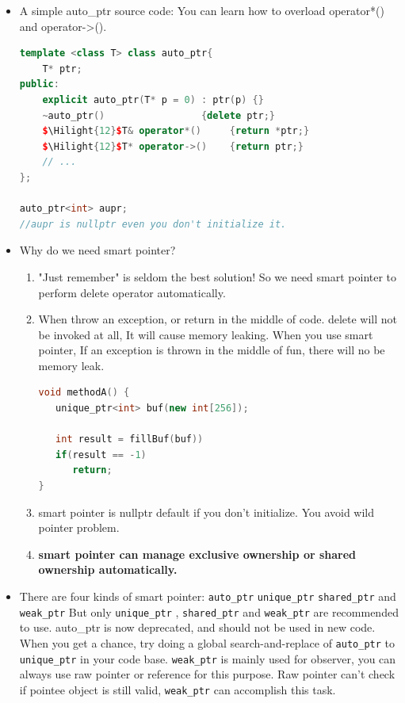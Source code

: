 \documentclass[a4paper,11pt,twoside]{book}
\newcommand{\Hilight}[1]{\makebox[0pt][l]{\color{yellow}\rule[-3pt]{#1em}{11pt}}}
\newcommand{\Hilight}[1]{}
\begin{document}
\begin{itemize}
\item A simple auto\_ptr source code: You can learn how to overload operator*() and operator->().
\begin{lstlisting}[frame=single, language=c++, mathescape=true]
template <class T> class auto_ptr{
    T* ptr;
public:
    explicit auto_ptr(T* p = 0) : ptr(p) {}
    ~auto_ptr()                 {delete ptr;}
    $\Hilight{12}$T& operator*()     {return *ptr;}
    $\Hilight{12}$T* operator->()    {return ptr;}
    // ...
};

auto_ptr<int> aupr;
//aupr is nullptr even you don't initialize it.
\end{lstlisting}

\item Why do we need smart pointer?
\begin{enumerate}
\item "Just remember" is seldom the best solution! So we need smart pointer to perform delete operator automatically.

\item When throw an exception, or return in the middle of code. delete will not be invoked at all, It will cause memory leaking. When you use smart pointer, If an exception is thrown in the middle of fun, there will no be memory leak.
\begin{lstlisting}[frame=single, language=c++]
void methodA() {
   unique_ptr<int> buf(new int[256]);

   int result = fillBuf(buf))
   if(result == -1)
      return;
}
\end{lstlisting}

\item smart pointer is nullptr default if you don't initialize. You avoid wild pointer problem.

\item \textbf{smart pointer can manage exclusive ownership or shared ownership automatically. }
\end{enumerate}

\item There are four kinds of smart pointer: \texttt{auto\_ptr} \texttt{unique\_ptr} \texttt{shared\_ptr} and \texttt{weak\_ptr}  But only \texttt{unique\_ptr} , \texttt{shared\_ptr} and \texttt{weak\_ptr} are recommended to use. auto\_ptr is now deprecated, and should not be used in new code. When you get a chance, try doing a global search-and-replace of \texttt{auto\_ptr} to \texttt{unique\_ptr} in your code base. \texttt{weak\_ptr} is mainly used for observer, you can always use raw pointer or reference for this purpose. Raw pointer can't check if pointee object is still valid, \texttt{weak\_ptr} can accomplish this task.


\end{itemize}
\end{document}
